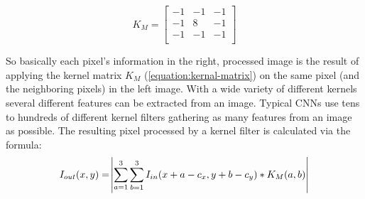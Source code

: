 \documentclass[12pt,twoside]{article}
\theoremstyle{plain}
\theoremstyle{definition}
\theoremstyle{remark}
\begin{document}
\begin{figure}
	\begin{equation}
		\label{equation:kernal-matrix}
		K_M =
		\begin{bmatrix}
		-1 & -1 & -1 \\
		-1 & 8 & -1 \\
		-1 & -1 & -1 \\
		\end{bmatrix}
	\end{equation}
\end{figure}
So basically each pixel's information in the right, processed image is the result of applying the kernel matrix $K_M$ (\ref{equation:kernal-matrix}) on the same pixel (and the neighboring pixels) in the left image. With a wide variety of different kernels several different features can be extracted from an image. Typical CNNs use tens to hundreds of different kernel filters gathering as many features from an image as possible. The resulting pixel processed by a kernel filter is calculated via the formula:
\begin{equation}
I_{out}(x,y) =
\abs{\sum_{a=1}^{3} \sum_{b=1}^{3} I_{in} (x+a-c_x, y+b-c_y) * K_M(a,b)}
\end{equation}
\end{document}
